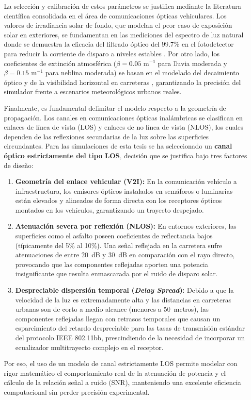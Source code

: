 La selección y calibración de estos parámetros se justifica mediante la literatura científica consolidada en el área de comunicaciones ópticas vehiculares. Los valores de irradiancia solar de fondo, que modelan el peor caso de exposición solar en exteriores, se fundamentan en las mediciones del espectro de luz natural donde se demuestra la eficacia del filtrado óptico del 99.7\% en el fotodetector para reducir la corriente de disparo a niveles estables \cite{ghassemlooy2019optical}. Por otro lado, los coeficientes de extinción atmosférica ($\beta = 0.05\text{ m}^{-1}$ para lluvia moderada y $\beta = 0.15\text{ m}^{-1}$ para neblina moderada) se basan en el modelado del decaimiento óptico y de la visibilidad horizontal en carreteras \cite{uysal2015vlc}, garantizando la precisión del simulador frente a escenarios meteorológicos urbanos reales.

Finalmente, es fundamental delimitar el modelo respecto a la geometría de propagación. Los canales en comunicaciones ópticas inalámbricas se clasifican en enlaces de línea de vista (LOS) y enlaces de no línea de vista (NLOS), los cuales dependen de las reflexiones secundarias de la luz sobre las superficies circundantes. Para las simulaciones de esta tesis se ha seleccionado un \textbf{canal óptico estrictamente del tipo LOS}, decisión que se justifica bajo tres factores de diseño:
\begin{enumerate}
	\item \textbf{Geometría del enlace vehicular (V2I):} En la comunicación vehículo a infraestructura, los emisores ópticos instalados en semáforos o luminarias están elevados y alineados de forma directa con los receptores ópticos montados en los vehículos, garantizando un trayecto despejado.
	\item \textbf{Atenuación severa por reflexión (NLOS):} En entornos exteriores, las superficies como el asfalto poseen coeficientes de reflectancia bajos (típicamente del 5\% al 10\%). Una señal reflejada en la carretera sufre atenuaciones de entre 20~dB y 30~dB en comparación con el rayo directo, provocando que las componentes reflejadas aporten una potencia insignificante que resulta enmascarada por el ruido de disparo solar.
	\item \textbf{Despreciable dispersión temporal (\textit{Delay Spread}):} Debido a que la velocidad de la luz es extremadamente alta y las distancias en carreteras urbanas son de corto a medio alcance (menores a 50~metros), las componentes reflejadas llegan con retrasos temporales que causan un esparcimiento del retardo despreciable para las tasas de transmisión estándar del protocolo IEEE 802.11bb, prescindiendo de la necesidad de incorporar un ecualizador multitrayecto complejo en el receptor.
\end{enumerate}
Por eso, el uso de un modelo de canal estrictamente LOS permite modelar con rigor matemático el comportamiento real de la atenuación de potencia y el cálculo de la relación señal a ruido (SNR), manteniendo una excelente eficiencia computacional sin perder precisión experimental.

